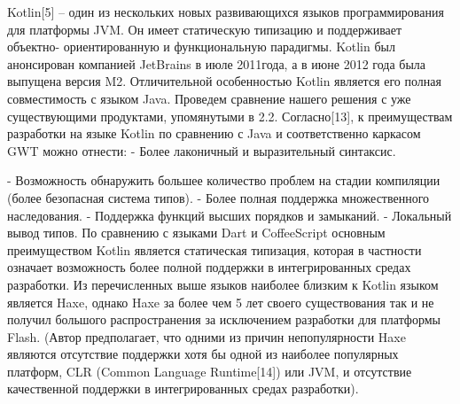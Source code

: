Kotlin[5] – один из нескольких новых развивающихся языков программирования для
платформы
JVM.
Он
имеет
статическую
типизацию
и
поддерживает
объектно-
ориентированную и функциональную парадигмы. Kotlin был анонсирован компанией
JetBrains в июле 2011года, а в июне 2012 года была выпущена версия M2. Отличительной
особенностью Kotlin является его полная совместимость с языком Java.
Проведем
сравнение
нашего
решения
с
уже
существующими
продуктами,
упомянутыми в 2.2.
Согласно[13], к преимуществам разработки на языке Kotlin по сравнению с Java и
соответственно каркасом GWT можно отнести:
-
Более лаконичный и выразительный синтаксис.

-
Возможность обнаружить большее количество проблем на стадии компиляции
(более безопасная система типов).
- Более полная поддержка множественного наследования.
- Поддержка функций высших порядков и замыканий.
- Локальный вывод типов.
По сравнению с языками Dart и CoffeeScript основным преимуществом Kotlin
является статическая типизация, которая в частности означает возможность более полной
поддержки в интегрированных средах разработки.
Из перечисленных выше языков наиболее близким к Kotlin языком является Haxe,
однако Haxe за более чем 5 лет своего существования так и
не получил большого
распространения за исключением разработки для платформы Flash. (Автор предполагает, что
одними из причин непопулярности Haxe являются отсутствие поддержки хотя бы одной из
наиболее популярных платформ, CLR (Common Language Runtime[14]) или JVM, и
отсутствие качественной поддержки в интегрированных средах разработки).
